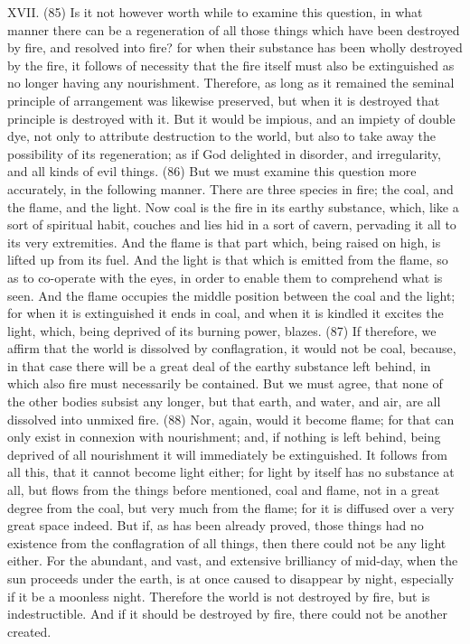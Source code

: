XVII. (85) Is it not however worth while to examine this question, in what manner there can be a
regeneration of all those things which have been destroyed by fire, and resolved into fire? for when
their substance has been wholly destroyed by the fire, it follows of necessity that the fire itself must
also be extinguished as no longer having any nourishment. Therefore, as long as it remained the
seminal principle of arrangement was likewise preserved, but when it is destroyed that principle is
destroyed with it. But it would be impious, and an impiety of double dye, not only to attribute
destruction to the world, but also to take away the possibility of its regeneration; as if God delighted
in disorder, and irregularity, and all kinds of evil things. (86) But we must examine this question
more accurately, in the following manner. There are three species in fire; the coal, and the flame,
and the light. Now coal is the fire in its earthy substance, which, like a sort of spiritual habit,
couches and lies hid in a sort of cavern, pervading it all to its very extremities. And the flame is that
part which, being raised on high, is lifted up from its fuel. And the light is that which is emitted from
the flame, so as to co-operate with the eyes, in order to enable them to comprehend what is seen.
And the flame occupies the middle position between the coal and the light; for when it is
extinguished it ends in coal, and when it is kindled it excites the light, which, being deprived of its
burning power, blazes. (87) If therefore, we affirm that the world is dissolved by conflagration, it
would not be coal, because, in that case there will be a great deal of the earthy substance left
behind, in which also fire must necessarily be contained. But we must agree, that none of the other
bodies subsist any longer, but that earth, and water, and air, are all dissolved into unmixed fire.
(88) Nor, again, would it become flame; for that can only exist in connexion with nourishment; and,
if nothing is left behind, being deprived of all nourishment it will immediately be extinguished. It
follows from all this, that it cannot become light either; for light by itself has no substance at all, but
flows from the things before mentioned, coal and flame, not in a great degree from the coal, but
very much from the flame; for it is diffused over a very great space indeed. But if, as has been
already proved, those things had no existence from the conflagration of all things, then there could
not be any light either. For the abundant, and vast, and extensive brilliancy of mid-day, when the
sun proceeds under the earth, is at once caused to disappear by night, especially if it be a
moonless night. Therefore the world is not destroyed by fire, but is indestructible. And if it should be
destroyed by fire, there could not be another created.

